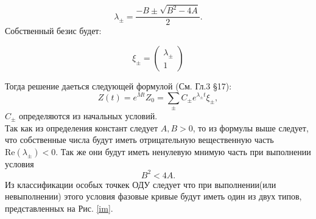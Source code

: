 \documentclass[a4paper,12pt,titlepage]{article}
\theoremstyle{definition}
\theoremstyle{theorem}
\theoremstyle{definition}
\begin{document}
\begin{equation}
    \lambda_{\pm} = \frac{-B \pm \sqrt{B^2 - 4A}}{2}.
\end{equation}
Собственный безис будет:
\begin{spacing}{1}
    \begin{equation}
        \xi_\pm = 
        \begin{pmatrix}
            \lambda_{\pm}\\
            1
        \end{pmatrix}
    \end{equation}
\end{spacing}
Тогда решение даеться следующей формулой (См. Гл.3 \S 17\cite{Arn}):
\begin{equation}
    Z(t) = e^{Mt}Z_0 = 
    \sum_{\pm} C_\pm e^{\lambda_{\pm}t}\xi_\pm,
\end{equation}
$C_{\pm}$ определяются из начальных условий.\\
Так как из определения констант следует $A, B > 0$, то из формулы выше следует, 
что собственные числа будут иметь отрицательную вещественную часть $\text{Re} (\lambda_{\pm}) < 0$. Так же они будут иметь 
ненулевую мнимую часть при выполнении условия
\begin{equation}\label{uslov}
    B^2 < 4A.
\end{equation}
Из классификации особых точкек ОДУ следует что при выполнении(или невыполнении) этого условия 
фазовые кривые будут иметь один из двух типов, представленных на Рис. \ref*{im}.
\end{document}
